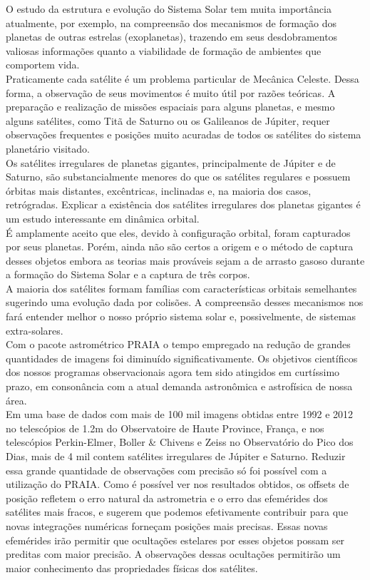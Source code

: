 \documentclass[12pt,a4paper]{monografia}
\newcommand{\PE}{Perkin-Elmer}
\newcommand{\BC}{Boller \& Chivens}
\begin{document}
\indent \indent O estudo da estrutura e evolução do Sistema Solar tem muita importância atualmente, por exemplo, na compreensão dos mecanismos de formação dos planetas de outras estrelas (exoplanetas), trazendo em seus desdobramentos valiosas informações quanto a viabilidade de formação de ambientes que comportem vida.\\
\indent Praticamente cada satélite é um problema particular de Mecânica Celeste. Dessa forma, a observação de seus movimentos é muito útil por razões teóricas. A preparação e realização de missões espaciais para alguns planetas, e mesmo alguns satélites, como Titã de Saturno ou os Galileanos de Júpiter, requer observações frequentes e posições muito acuradas de todos os satélites do sistema planetário visitado.\\
\indent Os satélites irregulares de planetas gigantes, principalmente de Júpiter e de Saturno, são substancialmente menores do que os satélites regulares e possuem órbitas mais distantes, excêntricas, inclinadas e, na maioria dos casos, retrógradas. Explicar a existência dos satélites irregulares dos planetas gigantes é um estudo interessante em dinâmica orbital.\\
\indent É amplamente aceito que eles, devido à configuração orbital, foram capturados por seus planetas. Porém, ainda não são certos a origem e o método de captura desses objetos embora as teorias mais prováveis sejam a de arrasto gasoso durante a formação do Sistema Solar e a captura de três corpos.\\
\indent A maioria dos satélites formam famílias com características orbitais semelhantes sugerindo uma evolução dada por colisões. A compreensão desses mecanismos nos fará entender melhor o nosso próprio sistema solar e, possivelmente, de sistemas extra-solares.\\
\indent Com o pacote astrométrico PRAIA o tempo empregado na redução de grandes quantidades de imagens foi diminuído significativamente. Os objetivos científicos dos nossos programas observacionais agora tem sido atingidos em curtíssimo prazo, em consonância com a atual demanda astronômica e astrofísica de nossa área.\\
\indent Em uma base de dados com mais de 100 mil imagens obtidas entre 1992 e 2012 no telescópios de 1.2m do Observatoire de Haute Province, França, e nos telescópios \PE, \BC{} e Zeiss no Observatório do Pico dos Dias, mais de 4 mil contem satélites irregulares de Júpiter e Saturno. Reduzir essa grande quantidade de observações com precisão só foi possível com a utilização do PRAIA. Como é possível ver nos resultados obtidos, os offsets de posição refletem o erro natural da astrometria e o erro das efemérides dos satélites mais fracos, e sugerem que podemos efetivamente contribuir para que novas integrações numéricas forneçam posições mais precisas. Essas novas efemérides irão permitir que ocultações estelares por esses objetos possam ser preditas com maior precisão. A observações dessas ocultações permitirão um maior conhecimento das propriedades físicas dos satélites.
\end{document}
